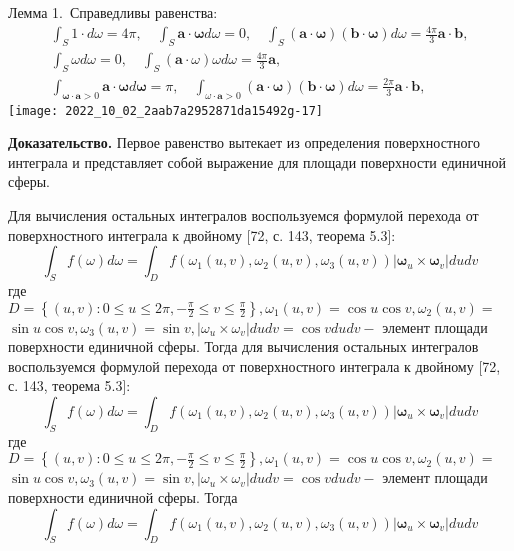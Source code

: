 Лемма 1.\ Справедливы равенства:
\[
    \begin{gathered}
        \int_{S} 1 \cdot d \omega=4 \pi, \quad \int_{S} \mathbf{a} \cdot \boldsymbol{\omega} d \omega=0,
        \quad \int_{S}(\mathbf{a} \cdot \boldsymbol{\omega})(\mathbf{b} \cdot \boldsymbol{\omega}) d
        \omega=\frac{4 \pi}{3} \mathbf{a} \cdot \mathbf{b}, \\
        \int_{S} \omega d \omega=0, \quad \int_{S}(\mathbf{a} \cdot \omega) \omega d
        \omega=\frac{4 \pi}{3} \mathbf{a}, \\
        \int_{\boldsymbol{\omega} \cdot \mathbf{a}>0} \mathbf{a} \cdot \boldsymbol{\omega} d
        \boldsymbol{\omega}=\pi, \quad \int_{\omega \cdot \mathbf{a}>0}(\mathbf{a} \cdot
        \boldsymbol{\omega})(\mathbf{b} \cdot \boldsymbol{\omega}) d \omega=\frac{2 \pi}{3} \mathbf{a} \cdot \mathbf{b},
    \end{gathered}
\]
\texttt{[image: 2022\_10\_02\_2aab7a2952871da15492g-17]}

\textbf{Доказательство.}
Первое равенство вытекает из определения поверхностного интеграла и представляет собой выражение для площади
поверхности единичной сферы.


Для вычисления остальных интегралов воспользуемся формулой перехода от поверхностного интеграла
к двойному [72, с. 143, теорема 5.3]:
\[
    \int_{S} f(\omega) d \omega=\int_{D} f\left(\omega_{1}(u, v), \omega_{2}(u, v),
    \omega_{3}(u, v)\right)\left|\boldsymbol{\omega}_{u} \times \boldsymbol{\omega}_{v}\right| d u d v
\]
где $D=\left\{(u, v): 0 \leqslant u \leqslant 2 \pi,-\frac{\pi}{2} \leqslant v \leqslant \frac{\pi}{2}\right\},
\omega_{1}(u, v)=\cos u \cos v, \omega_{2}(u, v)=$ $\sin u \cos v, \omega_{3}(u, v)=\sin v,\left|\omega_{u}
\times \omega_{v}\right| d u d v=\cos v d u d v-$ элемент площади поверхности единичной сферы.
Тогда для вычисления остальных интегралов воспользуемся формулой перехода от поверхностного интеграла
к двойному [72, с. 143, теорема 5.3]:
\[
    \int_{S} f(\omega) d \omega=\int_{D} f\left(\omega_{1}(u, v), \omega_{2}(u, v),
    \omega_{3}(u, v)\right)\left|\boldsymbol{\omega}_{u} \times \boldsymbol{\omega}_{v}\right| d u d v
\]
где $D=\left\{(u, v): 0 \leqslant u \leqslant 2 \pi,-\frac{\pi}{2} \leqslant v \leqslant
\frac{\pi}{2}\right\}, \omega_{1}(u, v)=\cos u \cos v, \omega_{2}(u, v)=$ $\sin u \cos v,
\omega_{3}(u, v)=\sin v,\left|\omega_{u} \times \omega_{v}\right| d u d v=\cos v d u d v-$
элемент площади поверхности единичной сферы.
Тогда
\[
    \int_{S} f(\omega) d \omega=\int_{D} f\left(\omega_{1}(u, v), \omega_{2}(u, v),
    \omega_{3}(u, v)\right)\left|\boldsymbol{\omega}_{u} \times \boldsymbol{\omega}_{v}\right| d u d v
\]



